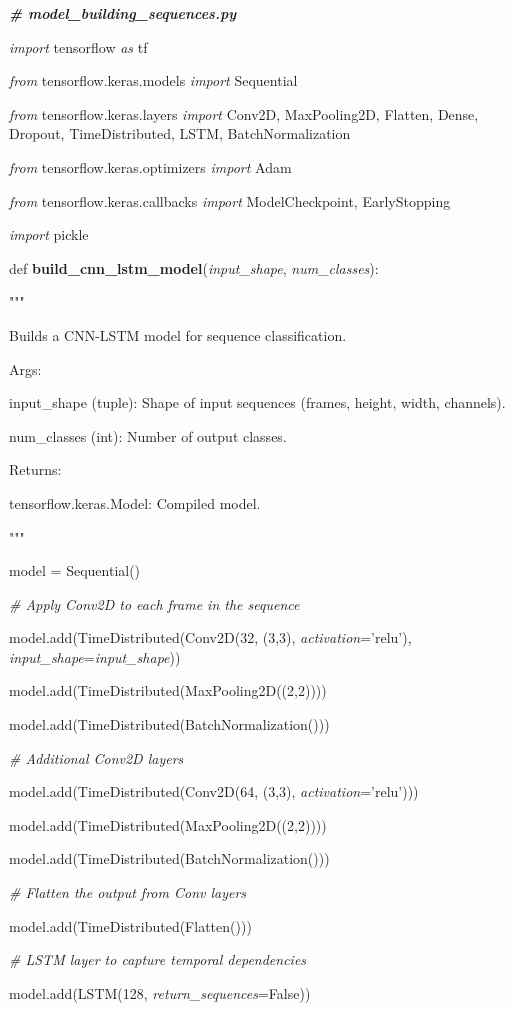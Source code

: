 \documentclass[
]{article}
\begin{document}
\emph{\textbf{\# model\_building\_sequences.py}}

\emph{import} tensorflow \emph{as} tf

\emph{from} tensorflow.keras.models \emph{import} Sequential

\emph{from} tensorflow.keras.layers \emph{import} Conv2D, MaxPooling2D, Flatten, Dense, Dropout, TimeDistributed, LSTM, BatchNormalization

\emph{from} tensorflow.keras.optimizers \emph{import} Adam

\emph{from} tensorflow.keras.callbacks \emph{import} ModelCheckpoint, EarlyStopping

\emph{import} pickle

def \textbf{build\_cnn\_lstm\_model}(\emph{input\_shape}, \emph{num\_classes}):

"""

Builds a CNN-LSTM model for sequence classification.

Args:

input\_shape (tuple): Shape of input sequences (frames, height, width, channels).

num\_classes (int): Number of output classes.

Returns:

tensorflow.keras.Model: Compiled model.

"""

model = Sequential()

\emph{\# Apply Conv2D to each frame in the sequence}

model.add(TimeDistributed(Conv2D(32, (3,3), \emph{activation}='relu'), \emph{input\_shape}=\emph{input\_shape}))

model.add(TimeDistributed(MaxPooling2D((2,2))))

model.add(TimeDistributed(BatchNormalization()))

\emph{\# Additional Conv2D layers}

model.add(TimeDistributed(Conv2D(64, (3,3), \emph{activation}='relu')))

model.add(TimeDistributed(MaxPooling2D((2,2))))

model.add(TimeDistributed(BatchNormalization()))

\emph{\# Flatten the output from Conv layers}

model.add(TimeDistributed(Flatten()))

\emph{\# LSTM layer to capture temporal dependencies}

model.add(LSTM(128, \emph{return\_sequences}=False))
\end{document}
